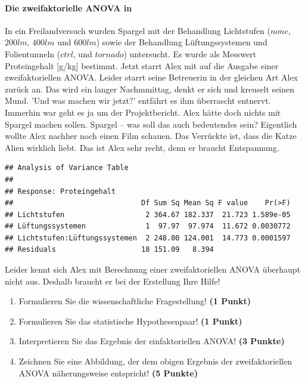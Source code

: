 \documentclass[a4paper, 9pt]{scrartcl}\usepackage[]{graphicx}\usepackage[]{xcolor}
\makeatletter
\newenvironment{kframe}{%
 \def\at@end@of@kframe{}%
 \ifinner\ifhmode%
  \def\at@end@of@kframe{\end{minipage}}%
  \begin{minipage}{\columnwidth}%
 \fi\fi%
 \def\FrameCommand##1{\hskip\@totalleftmargin \hskip-\fboxsep
 \colorbox{shadecolor}{##1}\hskip-\fboxsep
     \hskip-\linewidth \hskip-\@totalleftmargin \hskip\columnwidth}%
 \MakeFramed {\advance\hsize-\width
   \@totalleftmargin\z@ \linewidth\hsize
   \@setminipage}}%
 {\par\unskip\endMakeFramed%
 \at@end@of@kframe}
\newenvironment{knitrout}{}{} %
\makeatother
\begin{document}
\paragraph{Die zweifaktorielle ANOVA in \Rlogo}

In ein Freilandversuch wurden Spargel mit der Behandlung Lichtstufen ($none$, $200lm$, $400lm$ und $600lm$) sowie der Behandlung Lüftungssystemen und Folientunneln ($ctrl$, und $tornado$) untersucht. Es wurde als Messwert Proteingehalt [g/kg] bestimmt. Jetzt starrt Alex mit auf die \Rlogo Ausgabe einer zweifaktoriellen ANOVA. Leider starrt seine Betreuerin in der gleichen Art Alex zurück an. Das wird ein langer Nachmmittag, denkt er sich und kreuselt seinen Mund. 'Und was machen wir jetzt?' entfährt es ihm überrascht entnervt. Immerhin war geht es ja um der Projektbericht. Alex hätte doch nichts mit Spargel machen sollen. Spargel -- was soll das auch bedeutendes sein? Eigentlich wollte Alex nachher noch einen Film schauen. Das Verrückte ist, dass die Katze Alien wirklich liebt. Das ist Alex sehr recht, denn er braucht Entspannung.

\begin{knitrout}
\color{fgcolor}\begin{kframe}
\begin{verbatim}
## Analysis of Variance Table
## 
## Response: Proteingehalt
##                              Df Sum Sq Mean Sq F value    Pr(>F)
## Lichtstufen                   2 364.67 182.337  21.723 1.589e-05
## Lüftungssystemen              1  97.97  97.974  11.672 0.0030772
## Lichtstufen:Lüftungssystemen  2 248.00 124.001  14.773 0.0001597
## Residuals                    18 151.09   8.394
\end{verbatim}
\end{kframe}
\end{knitrout}

\vspace{1ex}

Leider kennt sich Alex mit Berechnung einer zweifaktoriellen ANOVA überhaupt nicht aus. Deshalb braucht er bei der Erstellung Ihre Hilfe! 

\begin{enumerate}
  \item Formulieren Sie die wissenschaftliche Fragestellung! \textbf{(1 Punkt)}
  \item Formulieren Sie das statistische Hypothesenpaar! \textbf{(1 Punkt)}
\item Interpretieren Sie das Ergebnis der einfaktoriellen ANOVA! \textbf{(3 Punkte)} 
\item Zeichnen Sie eine Abbildung, der dem obigen Ergebnis der
  zweifaktoriellen ANOVA näherungsweise entspricht! \textbf{(5 Punkte)}
\end{enumerate}
 
\end{document}
